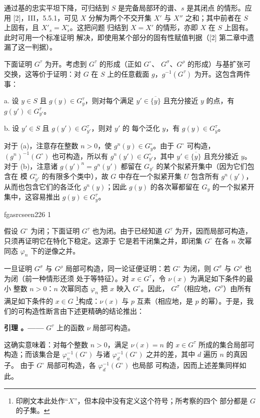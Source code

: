 \documentclass[12pt,twoside,openany]{book}
\numberwithin{equation}{section}
\newcommand{\fgaunitid}{unbound}
\newcommand{\src}[1]{%
  \phantomsection
  \hypertarget{src:\fgaunitid:#1}{}%
  \hypertarget{fga.\fgaunitid.p#1}{}%
  \ifcsname fgasrcseen#1\endcsname\else
    \expandafter\gdef\csname fgasrcseen#1\endcsname{1}%
    \hypertarget{src:#1}{}%
  \fi
  \marginpar{\raggedleft\footnotesize\sffamily #1}%
}
\theoremstyle{plain}
\theoremstyle{definition}
\theoremstyle{remark}
\newcommand{\result}[2]{%
  \par\medskip\noindent\textbf{#1%
  \if\relax\detokenize{#2}\relax\else\space#2\fi。——}\enspace
}
\begin{document}
通过基的忠实平坦下降，可归结到 $S$ 是完备局部环的谱、$s$ 是其闭点
的情形。应用 [2]，III，5.5.1，可见 $X$ 分解为两个不交开集 $X'$ 与
$X''$ 之和；其中前者在 $S$ 上固有，且 $X'_s=X_s^\circ$。这把问题
归结到 $X=X'$ 的情形，亦即 $X$ 在 $S$ 上固有。此时可用一个标准证明
解决，即使用某个部分的固有性赋值判据（[2] 第二章中遗漏了这一判据）。

下面证明 $G^\tau$ 为开。考虑到 $G^\tau$ 的形成（正如 $G^\circ$、
$G^\sigma$、$G^\rho$ 的形成）与基扩张可交换，这等价于证明：对 $G$
在 $S$ 上的任意截面 $g$，$g^{-1}(G^\tau)$ 为开。这包含两件事：

\medskip
\noindent a. 设 $y\in S$ 且 $g(y)\in G_y^\tau$，则对每个满足
$y'\in\overline{\{y\}}$ 且充分接近 $y$ 的点，有
$g(y')\in G_{y'}^\tau$。

\medskip
\noindent b. 设 $y'\in S$ 且 $g(y')\in G_{y'}^\tau$，则对 $y'$ 的
每个泛化 $y$，有 $g(y)\in G_y^\tau$。

对于 (a)，注意存在整数 $n>0$，使 $g^n(y)\in G_y^\circ$。由于
$G^\circ$ 可构造，$(g^n)^{-1}(G^\circ)$ 也可构造，所以有
$g^n(y')\in G_{y'}^\circ$，其中 $y'\in\overline{\{y\}}$ 且充分接近
$y$。对于 (b)，注意诸
$g(y')^n=g^n(y')$ 都留在 $G_{y'}$ 的某个拟紧开集中（因为它们包含在
模 $G_{y'}^\circ$ 的有限多个类中），故 $G$ 中存在一个拟紧开集 $U$
包含所有 $g^n(y')$，从而也包含它们的各泛化 $g^n(y)$；因此
$g(y)$ 的各次幂都留在 $G_y$ 的一个拟紧开集中，这容易推出
$g(y)\in G_y^\tau$。

\src{226}
假设 $G^\circ$ 为闭；下面证明 $G^\tau$ 也为闭。由于已经知道
$G^\tau$ 为开，因而局部可构造，只须再证明它在特化下稳定。这源于
它是若干闭集之并，即闭集 $G^\circ$ 在各 $n$ 次幂同态
$\varphi_n$ 下的逆像之并。

一旦证明 $G^\sigma$ 与 $G^\rho$ 局部可构造，同一论证便证明：若
$G^\circ$ 为闭，则 $G^\sigma$ 与 $G^\rho$ 也为闭（前一种情形还须
处于等特征）。对 $x\in G^\tau$，令 $\nu(x)$ 为满足如下条件的最小
整数 $n>0$：$n$ 次幂同态 $\varphi_n$ 把 $x$ 映入 $G^\circ$。因此，
$G^\sigma$（相应地，$G^\rho$）由所有满足如下条件的 $x\in G$
\footnote{印刷文本此处作“$X$”，但本段中没有定义这个符号；所考察的四个
部分都是 $G$ 的子集。}构成：$\nu(x)$ 与 $p$ 互素（相应地，是 $p$
的幂）。于是，我们的可构造性断言由下述更精确的结论推出：

\result{引理}{1.4} $G^\tau$ 上的函数 $\nu$ 局部可构造。

这确实意味着：对每个整数 $n>0$，满足 $\nu(x)=n$ 的
$x\in G^\tau$ 所成的集合局部可构造；而该集合是
$\varphi_n^{-1}(G^\circ)$ 与诸
$\varphi_d^{-1}(G^\circ)$ 之并的差，其中 $d$ 遍历 $n$ 的真因子。
由于 $G^\circ$ 局部可构造，各 $\varphi_d^{-1}(G^\circ)$ 也局部
可构造，因而上述差集同样如此。
\end{document}
